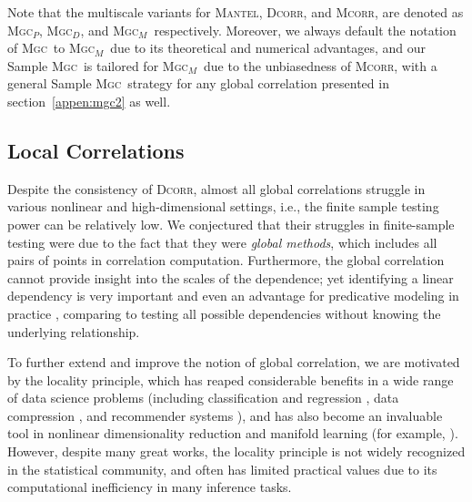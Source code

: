 \documentclass[11pt]{article}
\providecommand{\sct}[1]{{\normalfont\textsc{#1}}}
\newcommand{\Mgc}{\sct{Mgc}}
\newcommand{\Mgcp}{\sct{Mgc$_P$}}
\newcommand{\Mgcd}{\sct{Mgc$_D$}}
\newcommand{\Mgcm}{\sct{Mgc$_M$}}
\newcommand{\Dcorr}{\sct{Dcorr}}
\newcommand{\Mcorr}{\sct{Mcorr}}
\newcommand{\Mantel}{\sct{Mantel}}
\begin{document}
Note that the multiscale variants for \Mantel, \Dcorr, and \Mcorr, are denoted as \Mgcp, \Mgcd, and \Mgcm~respectively. Moreover, we always default the notation of \Mgc~to \Mgcm~due to its theoretical and numerical advantages, and our Sample \Mgc~is tailored for \Mgcm~due to the unbiasedness of \Mcorr, with a general Sample \Mgc~strategy for any global correlation presented in section~\ref{appen:mgc2} as well. 

\subsection{Local Correlations}

Despite the consistency of \Dcorr, almost all global correlations struggle in various nonlinear and high-dimensional settings, i.e., the finite sample testing power can be relatively low. We conjectured that their struggles in finite-sample testing were due to the fact that they were \emph{global methods}, which includes all pairs of points in correlation computation. Furthermore, the global correlation cannot provide insight into the scales of the dependence; yet identifying a linear dependency is very important and even an advantage for predicative modeling in practice \cite{cope2009}, comparing to testing all possible dependencies without knowing the underlying relationship. 

To further extend and improve the notion of global correlation, we are motivated by the locality principle, which has reaped considerable benefits in a wide range of data science problems (including classification and regression  \cite{Stone1977}, data compression \cite{DaubechiesWaveletBook}, and recommender systems \cite{Sarwar2000}), and has also become an invaluable tool in nonlinear dimensionality reduction and manifold learning (for example, \cite{
TorgersonBook, 
TenenbaumSilvaLangford2000, 
SaulRoweis2000, 
BelkinNiyogi2003,
DiffusionPNAS,
MMS:NoisyDictionaryLearning}). However, despite many great works, the locality principle is not widely recognized in the statistical community, and often has limited practical values due to its computational inefficiency in many inference tasks.
\end{document}
